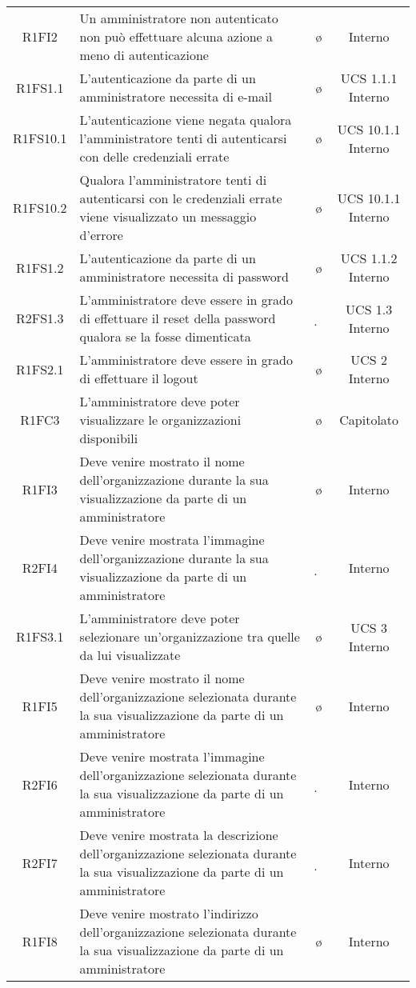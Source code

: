 {\begin{longtable}{ c C{4cm} c c}

R1FI2 & Un amministratore non autenticato non può effettuare alcuna azione a meno di autenticazione & \o & Interno \\
R1FS1.1 & L’autenticazione da parte di un amministratore necessita di e-mail & \o & UCS 1.1.1 Interno\\
R1FS10.1 & L’autenticazione viene negata qualora l'amministratore tenti di autenticarsi con delle credenziali errate & \o & UCS 10.1.1 Interno \\
R1FS10.2 & Qualora l'amministratore tenti di autenticarsi con le credenziali errate viene visualizzato un messaggio d’errore & \o & UCS 10.1.1 Interno \\
R1FS1.2 & L’autenticazione da parte di un amministratore necessita di password & \o & UCS 1.1.2 Interno\\
R2FS1.3 & L'amministratore deve essere in grado di effettuare il reset della password qualora se la fosse dimenticata & \d & UCS 1.3 Interno\\
R1FS2.1 & L'amministratore deve essere in grado di effettuare il logout & \o & UCS 2 Interno\\
R1FC3 & L'amministratore deve poter visualizzare le organizzazioni disponibili & \o & Capitolato\\
R1FI3 & Deve venire mostrato il nome dell'organizzazione durante la sua visualizzazione da parte di un amministratore & \o & Interno\\
R2FI4 & Deve venire mostrata l'immagine dell'organizzazione durante la sua visualizzazione da parte di un amministratore & \d & Interno\\
R1FS3.1 & L'amministratore deve poter selezionare un'organizzazione tra quelle da lui visualizzate & \o & UCS 3 Interno\\
R1FI5 & Deve venire mostrato il nome dell'organizzazione selezionata durante la sua visualizzazione da parte di un amministratore & \o & Interno\\
R2FI6 & Deve venire mostrata l'immagine dell'organizzazione selezionata durante la sua visualizzazione da parte di un amministratore & \d & Interno\\
R2FI7 & Deve venire mostrata la descrizione dell'organizzazione selezionata durante la sua visualizzazione da parte di un amministratore & \d & Interno\\
R1FI8 & Deve venire mostrato l'indirizzo dell'organizzazione selezionata durante la sua visualizzazione da parte di un amministratore & \o & Interno\\

\end{longtable}}
